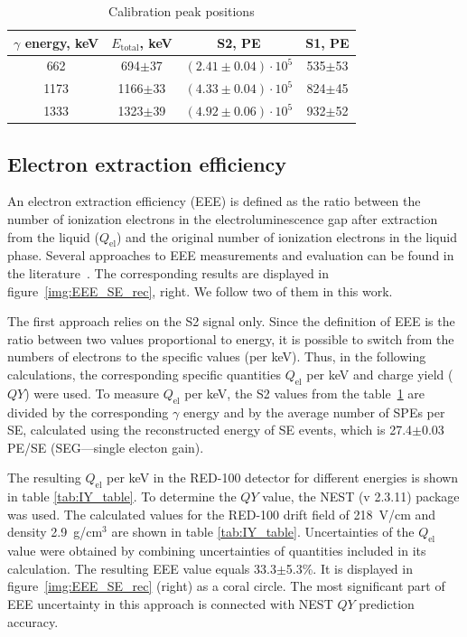 \documentclass[a4paper,11pt]{article}
\begin{document}
\begin{table}[hbt]
    \centering
        \caption{Calibration peak positions}
\begin{tabular}{|c|c|c|c|}
\hline
    $\gamma$ energy, keV & $E_{\text{total}}$, keV & S2, PE & S1, PE \\
    \hline
    \hspace{0.5em}662 & \hspace{0.5em}694$\pm$37 & $(2.41\pm0.04)\cdot10^5$ & 535$\pm$53\\
    \hline
    1173 & 1166$\pm$33 & $(4.33\pm0.04)\cdot10^5$ & 824$\pm$45\\
    \hline
    1333 & 1323$\pm$39 & $(4.92\pm0.06)\cdot10^5$ & 932$\pm$52\\
    \hline
\end{tabular}    
\label{tab:calibration_table}
\end{table}

\subsection{Electron extraction efficiency}
\label{sec:EEE_LY}
An electron extraction efficiency (EEE) is defined as the ratio between the number of ionization electrons in the electroluminescence gap after extraction from the liquid ($Q_{\text{el}}$) and the original number of ionization electrons in the liquid phase. Several approaches to EEE measurements and evaluation can be found in the literature~\cite{Gouschin1978,AprileEEE_2014,Edwards_2018,RED100_2019,PhysRevD.99.103024}. The corresponding results are displayed in figure~\ref{img:EEE_SE_rec}, right. We follow two of them in this work.

The first approach relies on the S2 signal only. Since the definition of EEE is the ratio between two values proportional to energy, it is possible to switch from the numbers of electrons to the specific values (per keV). Thus, in the following calculations, the corresponding specific quantities $Q_{\text{el}}$ per keV and charge yield ($QY$) were used. To measure $Q_{\text{el}}$ per keV, the S2 values from the table~\ref{tab:calibration_table} are divided by the corresponding $\gamma$ energy and by the average number of SPEs per SE, calculated using the reconstructed energy of SE events, which is 27.4$\pm$0.03 PE/SE (SEG---single electon gain).

The resulting $Q_{\text{el}}$ per keV in the RED-100 detector for different energies is shown in table \ref{tab:IY_table}. To determine the $QY$ value, the NEST (v 2.3.11) \cite{szydagis_m_2023_7577399} package was used. The calculated values for the RED-100 drift field of 218~V/cm and density 2.9~g/cm$^3$ are shown in table \ref{tab:IY_table}. Uncertainties of the $Q_{\text{el}}$ value were obtained by combining uncertainties of quantities included in its calculation. The resulting EEE value equals 33.3$\pm$5.3\%. It is displayed in figure~\ref{img:EEE_SE_rec} (right) as a coral circle. The most significant part of EEE uncertainty in this approach is connected with NEST $QY$ prediction accuracy.
\end{document}
